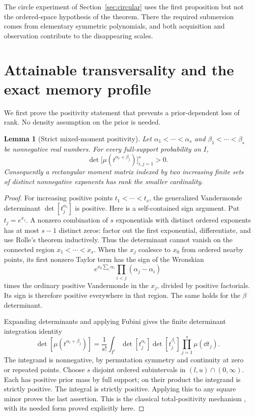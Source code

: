 \documentclass[11pt]{amsart}
\newtheorem{lemma}[theorem]{Lemma}
\theoremstyle{definition}\newtheorem{definition}[theorem]{Definition}
\theoremstyle{remark}\newtheorem{remark}[theorem]{Remark}
\begin{document}
The circle experiment of Section~\ref{sec:circular} uses the first
proposition but not the ordered-space hypothesis of the theorem. There
the required submersion comes from elementary symmetric polynomials,
and both acquisition and observation contribute to the disappearing
scales.

\section{Attainable transversality and the exact memory profile}\label{sec:rank}
We first prove the positivity statement that prevents a prior-dependent
loss of rank. No density assumption on the prior is needed.

\begin{lemma}[Strict mixed-moment positivity]\label{lem:mixed-moment}
Let $\alpha_1<\cdots<\alpha_s$ and $\beta_1<\cdots<\beta_s$ be
nonnegative real numbers. For every full-support probability on $I$,
\begin{equation}\label{eq:mixed-minor}
 \det\bigl[\mu(t^{\alpha_i+\beta_j})\bigr]_{i,j=1}^s>0.
\end{equation}
Consequently a rectangular moment matrix indexed by two increasing finite
sets of distinct nonnegative exponents has rank the smaller cardinality.
\end{lemma}
\begin{proof}
For increasing positive points $t_1<\cdots<t_s$, the generalized
Vandermonde determinant $\det[t_j^{\alpha_i}]$ is positive. Here is a
self-contained sign argument. Put $t_j=e^{x_j}$. A nonzero combination
of $s$ exponentials with distinct ordered exponents has at most $s-1$
distinct zeros: factor out the first exponential, differentiate, and use
Rolle's theorem inductively. Thus the determinant cannot vanish on the
connected region $x_1<\cdots<x_s$. When the $x_j$ coalesce to $x_0$
from ordered nearby points, its first nonzero Taylor term has the sign
of the Wronskian
\[
 e^{x_0\sum_i\alpha_i}\prod_{i<j}(\alpha_j-\alpha_i)
\]
times the ordinary positive Vandermonde in the $x_j$, divided by
positive factorials. Its sign is therefore positive everywhere in that
region. The same holds for the $\beta$ determinant.

Expanding determinants and applying Fubini gives the finite determinant
integration identity
\[
 \det[\mu(t^{\alpha_i+\beta_j})]
 =\frac1{s!}\int_{I^s}
       \det[t_j^{\alpha_i}]\det[t_j^{\beta_i}]
       \prod_{j=1}^s\mu(\dd t_j).
\]
The integrand is nonnegative, by permutation symmetry and continuity at
zero or repeated points. Choose $s$ disjoint ordered subintervals in
$(l,u)\cap(0,\infty)$. Each has positive prior mass by full support;
on their product the integrand is strictly positive. The integral is
strictly positive. Applying this to any square minor proves the last
assertion. This is the classical total-positivity mechanism
\cite{Pinkus}, with its needed form proved explicitly here.
\end{proof}
\end{document}
